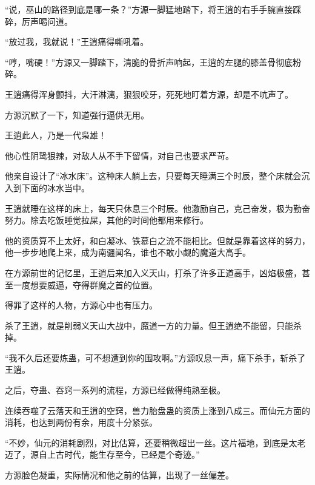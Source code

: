 \begin{this_body}
“说，巫山的路径到底是哪一条？”方源一脚猛地踏下，将王逍的右手手腕直接踩碎，厉声喝问道。

“放过我，我就说！”王逍痛得嘶吼着。

“哼，嘴硬！”方源又一脚踏下，清脆的骨折声响起，王逍的左腿的膝盖骨彻底粉碎。

王逍痛得浑身颤抖，大汗淋漓，狠狠咬牙，死死地盯着方源，却是不吭声了。

方源沉默了一下，知道强行逼供无用。

王逍此人，乃是一代枭雄！

他心性阴鸷狠辣，对敌人从不手下留情，对自己也要求严苛。

他亲自设计了“冰水床”。这种床人躺上去，只要每天睡满三个时辰，整个床就会沉入到下面的冰水当中。

王逍就睡在这样的床上，每天只休息三个时辰。他激励自己，克己奋发，极为勤奋努力。除去吃饭睡觉拉屎，其他的时间他都用来修行。

他的资质算不上太好，和白凝冰、铁慕白之流不能相比。但就是靠着这样的努力，他一步步地爬上来，成为南疆闻名，谁也不敢小觑的魔道大高手。

在方源前世的记忆里，王逍后来加入义天山，打杀了许多正道高手，凶焰极盛，甚至一度想要威逼，夺得群魔之首的位置。

得罪了这样的人物，方源心中也有压力。

杀了王逍，就是削弱义天山大战中，魔道一方的力量。但王逍绝不能留，只能杀掉。

“我不久后还要炼蛊，可不想遭到你的围攻啊。”方源叹息一声，痛下杀手，斩杀了王逍。

之后，夺蛊、吞窍一系列的流程，方源已经做得纯熟至极。

连续吞噬了云落天和王逍的空窍，兽力胎盘蛊的资质上涨到八成三。而仙元方面的消耗，也达到两份有余，用度十分紧张。

“不妙，仙元的消耗剧烈，对比估算，还要稍微超出一丝。这片福地，到底是太老迈了，源自上古时代，能生存至今，已经是个奇迹。”

方源脸色凝重，实际情况和他之前的估算，出现了一丝偏差。

\end{this_body}

